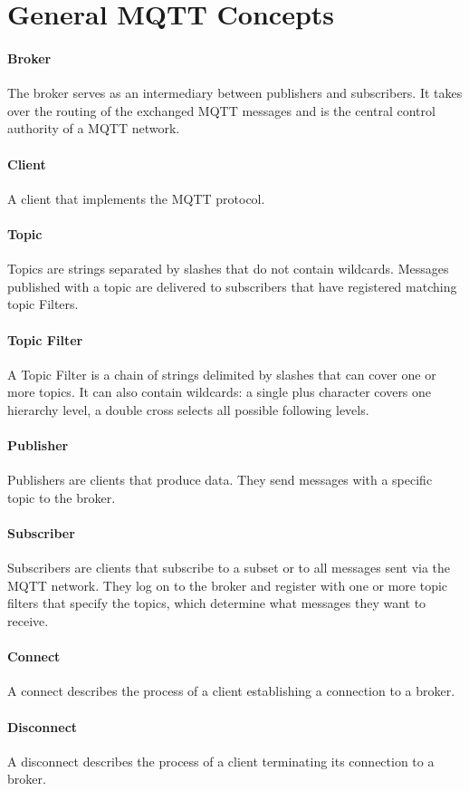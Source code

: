 \section{General MQTT Concepts}
\paragraph{Broker}
The broker serves as an intermediary between publishers and subscribers.
It takes over the routing of the exchanged MQTT messages and is the central control authority of a MQTT network.
\paragraph{Client}
A client that implements the MQTT protocol. 
\paragraph{Topic}
Topics are strings separated by slashes that do not contain wildcards.
Messages published with a topic are delivered to subscribers that have registered matching topic Filters.
\paragraph{Topic Filter}
A Topic Filter is a chain of strings delimited by slashes that 
can cover one or more topics. 
It can also contain wildcards: a single plus character covers one hierarchy level, a double cross selects all possible following levels.
\paragraph{Publisher}
Publishers are clients that produce data.
They send messages with a specific topic to the broker.
\paragraph{Subscriber}
Subscribers are clients that subscribe to a subset or to all messages sent via the
MQTT network.
They log on to the broker and register with one or more topic filters that specify the topics, which determine what messages they want to receive.
\paragraph{Connect}
A connect describes the process of a client establishing a connection to a broker.
\paragraph{Disconnect}
A disconnect describes the process of a client terminating its connection to a broker.


